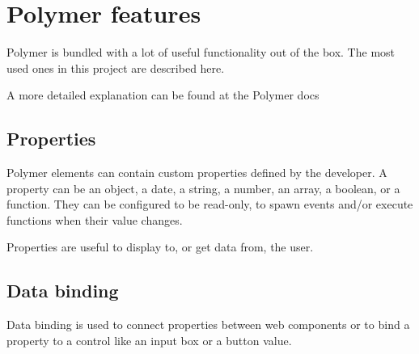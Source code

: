 
\section{Polymer features}
Polymer is bundled with a lot of useful functionality out of the box.
The most used ones in this project are described here.

A more detailed explanation can be found at the Polymer docs\cite{polymerdocs}
\subsection{Properties}
Polymer elements can contain custom properties defined by the developer.
A property can be an object, a date, a string, a number, an array, a boolean, or a function.
They can be configured to be read-only, to spawn events and/or execute functions
when their value changes.

Properties are useful to display to, or get data from, the user.
\subsection{Data binding}
Data binding is used to connect properties between web components or to bind a
property to a control like an input box or a button value.

